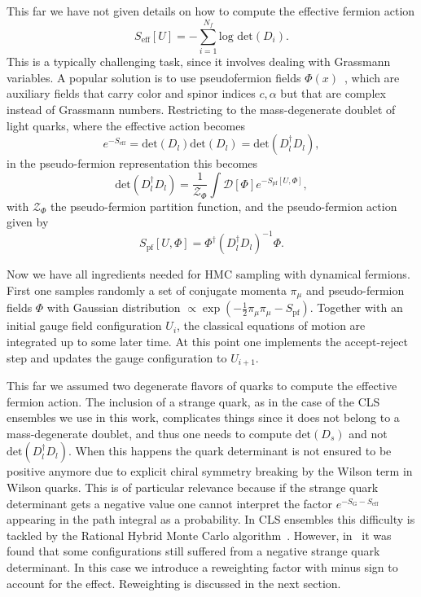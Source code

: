 This far we have not given details on how to compute the effective fermion action
\begin{equation}
S_{\textrm{eff}}[U]=-\sum_{i=1}^{N_f}\textrm{log det}(D_i).
\end{equation}
This is a typically challenging task, since it involves dealing with Grassmann variables. A popular solution is to use pseudofermion fields $\Phi(x)$~\citep{Weingarten:1980hx}, which are auxiliary fields that carry color and spinor indices $c,\alpha$ but that are complex instead of Grassmann numbers. Restricting to the mass-degenerate doublet of light quarks, where the effective action becomes
\begin{equation}
e^{-S_{\textrm{eff}}}=\textrm{det}(D_l)\textrm{det}(D_l)=\textrm{det}(D_l^{\dagger}D_l),
\end{equation}
in the pseudo-fermion representation this becomes
\begin{equation}
\textrm{det}(D_l^{\dagger}D_l)=\frac{1}{\mathcal{Z}_{\Phi}}\int\mathcal{D}[\Phi]e^{-S_{\textrm{pf}}[U,\Phi]},
\end{equation}
with $\mathcal{Z}_{\Phi}$ the pseudo-fermion partition function, and the pseudo-fermion action given by
\begin{equation}
S_{\textrm{pf}}[U,\Phi]=\Phi^{\dagger}\left(D_l^{\dagger}D_l\right)^{-1}\Phi.
\end{equation}

Now we have all ingredients needed for HMC sampling with dynamical fermions. First one samples randomly a set of conjugate momenta $\pi_{\mu}$ and pseudo-fermion fields $\Phi$ with Gaussian distribution $\propto\exp\left(-\frac{1}{2}\pi_{\mu}\pi_{\mu}-S_{\textrm{pf}}\right)$. Together with an initial gauge field configuration $U_{i}$, the classical equations of motion are integrated up to some later time. At this point one implements the accept-reject step and updates the gauge configuration to $U_{i+1}$.

This far we assumed two degenerate flavors of quarks to compute the effective fermion action. The inclusion of a strange quark, as in the case of the CLS ensembles we use in this work, complicates things since it does not belong to a mass-degenerate doublet, and thus one needs to compute $\textrm{det}(D_s)$ and not $\textrm{det}(D_l^{\dagger}D_l)$. When this happens the quark determinant is not ensured to be positive anymore due to explicit chiral symmetry breaking by the Wilson term in Wilson quarks. This is of particular relevance because if the strange quark determinant gets a negative value one cannot interpret the factor $e^{-S_{\textrm{G}}-S_{\textrm{eff}}}$ appearing in the path integral as a probability. In CLS ensembles this difficulty is tackled by the Rational Hybrid Monte Carlo algorithm~\citep{Kennedy:1998cu,Clark:2006fx}. However, in~\citep{Mohler:2020txx} it was found that some configurations still suffered from a negative strange quark determinant. In this case we introduce a reweighting factor with minus sign to account for the effect. Reweighting is discussed in the next section.

